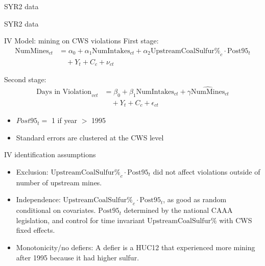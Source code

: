 \documentclass{beamer}
\begin{document}
\begin{frame}{SYR2 data}  
\end{frame}

\begin{frame}{SYR2 data}  
\end{frame}

\begin{frame}{IV Model: mining on CWS violations}
First stage:
\begin{equation}\label{1ststage2sls}
\begin{split}
\text{NumMines}_{ct} &= \alpha_0 + \alpha_1\text{NumIntakes}_{ct} + \alpha_2\text{UpstreamCoalSulfur\%}_c \cdot \text{Post95}_t \\
&\quad + Y_t + C_c + \nu_{ct}
\end{split}
\end{equation}

Second stage:
\begin{equation}\label{2ndstage2sls}
\begin{split}
\text{Days in Violation}_{vct} &= \beta_0 + \beta_1\text{NumIntakes}_{ct} + \gamma\widehat{\text{NumMines}}_{ct} \\
&\quad + Y_t + C_c + \epsilon_{ct}
\end{split}
\end{equation}

\begin{itemize}
    \begin{itemize}
        \item $Post95_t=$ 1 if year $>$ 1995 
        \item Standard errors are clustered at the CWS level
    \end{itemize}
\end{itemize}
\end{frame}

\begin{frame}{IV identification assumptions}
    \begin{itemize}
        \item Exclusion: $\text{UpstreamCoalSulfur\%}_c \cdot \text{Post95}_t$ did not affect violations outside of number of upstream mines.
        \item Independence: $\text{UpstreamCoalSulfur\%}_c \cdot \text{Post95}_t$, as good as random conditional on covariates. $\text{Post95}_t$ determined by the national CAAA legislation, and control for time invariant $\text{UpstreamCoalSulfur\%}$ with CWS fixed effects.
        \item Monotonicity/no defiers: A defier is a HUC12 that experienced more mining after 1995 because it had higher sulfur.
    \end{itemize}
\end{frame}
\end{document}
